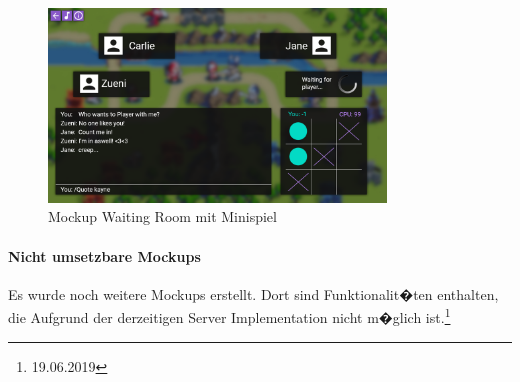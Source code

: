\documentclass[12pt, titlepage]{scrartcl}
\begin{document}
		\begin{figure}[H] 
			\centering
			\includegraphics[width=0.8\textwidth]{Waiting_Room_Game_With_TTT.png}
			\caption{Mockup Waiting Room mit Minispiel}
			\label{WaitingRoomWithMiniGame}
		\end{figure}
	
		\paragraph{Nicht umsetzbare Mockups}
		Es wurde noch weitere Mockups erstellt. Dort sind Funktionalit�ten enthalten, die Aufgrund der derzeitigen Server Implementation nicht m�glich ist.\footnote{19.06.2019}
		
\end{document}
